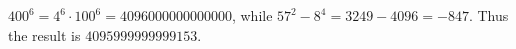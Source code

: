 $400^6=4^6\cdot 100^6=4096000000000000$, while $57^2-8^4=3249-4096=-847$. Thus the result is $\boxed{4095999999999153}$.
